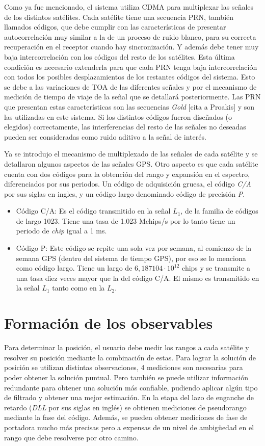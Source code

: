 \documentclass[a4paper,12pt,oneside,onecolumn,final,openright]{book}%
\begin{document}
	Como ya fue mencionado, el sistema utiliza CDMA para multiplexar las señales de los distintos satélites. Cada satélite tiene una secuencia PRN, también llamados códigos, que debe cumplir con las características de presentar autocorrelación muy similar a la de un proceso de ruido blanco, para su correcta recuperación en el receptor cuando hay sincronización. Y además debe tener muy baja intercorrelación con los códigos del resto de los satélites. Esta última condición es necesario extenderla para que cada PRN tenga baja intercorrelación con todos los posibles desplazamientos de los restantes códigos del sistema. Esto se debe a las variaciones de TOA de las diferentes señales y por el mecanismo de medición de tiempo de viaje de la señal que se detallará posteriormente. Las PRN que presentan estas características son las secuencias \textit{Gold} [cita a Proakis] y son las utilizadas en este sistema. Si los distintos códigos fueron diseñados (o elegidos) correctamente, las interferencias del resto de las señales no deseadas pueden ser consideradas como ruido aditivo a la señal de interés.
	
	Ya se introdujo el mecanismo de multiplexado de las señales de cada satélite y se detallaron algunos aspectos de las señales GPS. Otro aspecto es que cada satélite cuenta con dos códigos para la obtención del rango y expansión en el espectro, diferenciados por sus periodos. Un código de adquisición gruesa, el código \textit{C/A} por sus siglas en ingles, y un código largo denominado código de precisión \textit{P}.
\begin{itemize}
	\item Código C/A: Es el código transmitido en la señal $L_1$, de la familia de códigos de largo 1023. Tiene una tasa de 1.023 Mchips/s por lo tanto tiene un periodo de \textit{chip} igual a 1 ms.
	\item Código P: Este código se repite una sola vez por semana, al comienzo de la semana GPS (dentro del sistema de tiempo GPS), por eso se lo menciona como código largo. Tiene un largo de $6,187104\cdot 10^{12}$ chips y se transmite a una tasa diez veces mayor que la del código C/A. El mismo es transmitido en la señal $L_1$ tanto como en la $L_2$.
\end{itemize}
	
\section{Formación de los observables}
	Para determinar la posición, el usuario debe medir los rangos a cada satélite y resolver su posición mediante la combinación de estas. Para lograr la solución de posición se utilizan distintas observaciones, 4 mediciones son necesarias para poder obtener la solución puntual. Pero también se puede utilizar información redundante para obtener una solución más confiable, pudiendo aplicar algún tipo de filtrado y obtener una mejor estimación. En la etapa del lazo de enganche de retardo (\textit{DLL} por sus siglas en inglés) se obtienen mediciones de pseudorango mediante la fase del código. Además, se pueden obtener mediciones de fase de portadora mucho más precisas pero a expensas de un nivel de ambigüedad en el rango que debe resolverse por otro camino.
	
\end{document}
